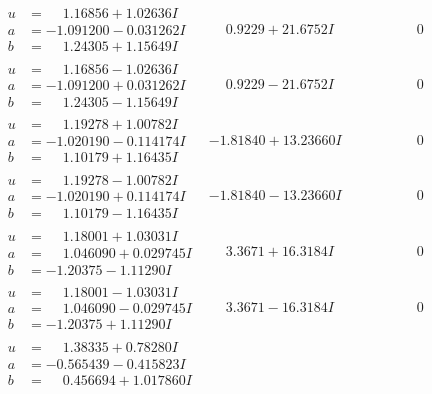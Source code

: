 \documentclass[1p]{elsarticle_modified}
\theoremstyle{definition}
\begin{document}
$$\begin{array}{c|c|c}
\begin{aligned}
u &= \phantom{-}1.16856 + 1.02636 I \\
a &= -1.091200 - 0.031262 I \\
b &= \phantom{-}1.24305 + 1.15649 I\end{aligned}
 & \phantom{-}0.9229 + 21.6752 I & \phantom{-0.000000 } 0 \\ \hline\begin{aligned}
u &= \phantom{-}1.16856 - 1.02636 I \\
a &= -1.091200 + 0.031262 I \\
b &= \phantom{-}1.24305 - 1.15649 I\end{aligned}
 & \phantom{-}0.9229 - 21.6752 I & \phantom{-0.000000 } 0 \\ \hline\begin{aligned}
u &= \phantom{-}1.19278 + 1.00782 I \\
a &= -1.020190 - 0.114174 I \\
b &= \phantom{-}1.10179 + 1.16435 I\end{aligned}
 & -1.81840 + 13.23660 I & \phantom{-0.000000 } 0 \\ \hline\begin{aligned}
u &= \phantom{-}1.19278 - 1.00782 I \\
a &= -1.020190 + 0.114174 I \\
b &= \phantom{-}1.10179 - 1.16435 I\end{aligned}
 & -1.81840 - 13.23660 I & \phantom{-0.000000 } 0 \\ \hline\begin{aligned}
u &= \phantom{-}1.18001 + 1.03031 I \\
a &= \phantom{-}1.046090 + 0.029745 I \\
b &= -1.20375 - 1.11290 I\end{aligned}
 & \phantom{-}3.3671 + 16.3184 I & \phantom{-0.000000 } 0 \\ \hline\begin{aligned}
u &= \phantom{-}1.18001 - 1.03031 I \\
a &= \phantom{-}1.046090 - 0.029745 I \\
b &= -1.20375 + 1.11290 I\end{aligned}
 & \phantom{-}3.3671 - 16.3184 I & \phantom{-0.000000 } 0 \\ \hline\begin{aligned}
u &= \phantom{-}1.38335 + 0.78280 I \\
a &= -0.565439 - 0.415823 I \\
b &= \phantom{-}0.456694 + 1.017860 I\end{aligned}

\end{array}$$
\end{document}
